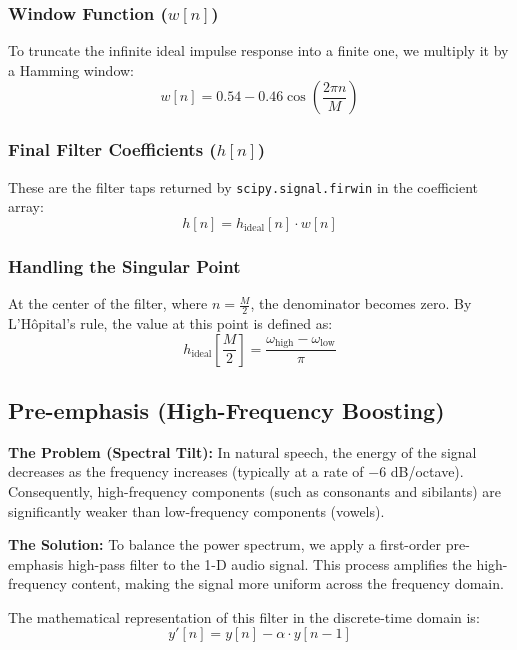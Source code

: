 \subsubsection{Window Function ($w[n]$)}
To truncate the infinite ideal impulse response into a finite one, we multiply it by a Hamming window:
\begin{equation}
w[n] = 0.54 - 0.46 \cos\left(\frac{2\pi n}{M}\right)
\end{equation}

\subsubsection{Final Filter Coefficients ($h[n]$)}
These are the filter taps returned by \texttt{scipy.signal.firwin} in the coefficient array:
\begin{equation}
h[n] = h_{\text{ideal}}[n] \cdot w[n]
\end{equation}

\subsubsection{Handling the Singular Point}
At the center of the filter, where $n = \frac{M}{2}$, the denominator becomes zero. By L'H\^{o}pital's rule, the value at this point is defined as:
\begin{equation}
h_{\text{ideal}}\left[\frac{M}{2}\right] = \frac{\omega_{\text{high}} - \omega_{\text{low}}}{\pi}
\end{equation}

\subsection{Pre-emphasis (High-Frequency Boosting)}

\textbf{The Problem (Spectral Tilt):} In natural speech, the energy of the signal decreases as the frequency increases (typically at a rate of $-6$ dB/octave). Consequently, high-frequency components (such as consonants and sibilants) are significantly weaker than low-frequency components (vowels). 

\textbf{The Solution:} To balance the power spectrum, we apply a first-order pre-emphasis high-pass filter to the 1-D audio signal. This process amplifies the high-frequency content, making the signal more uniform across the frequency domain. 

The mathematical representation of this filter in the discrete-time domain is:
\begin{equation}
    y'[n] = y[n] - \alpha \cdot y[n-1]
\end{equation}

